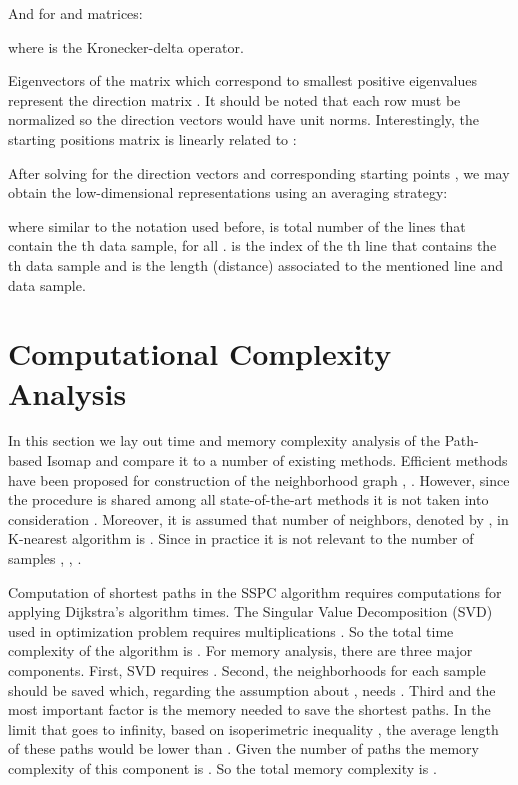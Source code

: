 \documentclass[10pt,journal,cspaper,compsoc]{IEEEtran}
\begin{document}
And for  and  matrices:



where  is the Kronecker-delta operator.

Eigenvectors of the matrix  which correspond to  smallest positive eigenvalues represent the  direction matrix . It should be noted that each row must be normalized so the direction vectors would have unit norms. Interestingly, the starting positions matrix  is linearly related to :


After solving for the direction vectors  and corresponding starting points , we may obtain the low-dimensional representations using an averaging strategy:

where similar to the notation used before,  is total number of the lines that contain the th data sample,  for all .  is the index of the th line that contains the th data sample and  is the length (distance) associated to the mentioned line and data sample.

\section{Computational Complexity Analysis}
In this section we lay out time and memory complexity analysis of the Path-based Isomap and compare it to a number of existing methods. Efficient methods have been proposed for construction of the neighborhood graph  \cite{indyk2004nearest}, \cite{seidl1998optimal}. However, since the procedure is shared among all state-of-the-art methods it is not taken into consideration \cite{van2009dimensionality}. Moreover, it is assumed that number of neighbors, denoted by , in K-nearest algorithm is . Since in practice it is not relevant to the number of samples \cite{tenenbaum2000global}, \cite{roweis2000nonlinear}, \cite{belkin2003laplacian}. 

Computation of shortest paths in the SSPC algorithm requires  computations for applying Dijkstra's algorithm \cite{even2011graph}  times. The Singular Value Decomposition (SVD) used in optimization problem requires  multiplications \cite{henry2010singular}. So the total time complexity of the algorithm is . For memory analysis, there are three major components. First, SVD requires  \cite{henry2010singular}. Second, the  neighborhoods for each sample should be saved which, regarding the assumption about , needs . Third and the most important factor is the memory needed to save the shortest paths. In the limit that  goes to infinity, based on isoperimetric inequality \cite{osserman1978isoperimetric}, the average length of these paths would be lower than . Given the number of paths  the memory complexity of this component is . So the total memory complexity is . 
\end{document}
